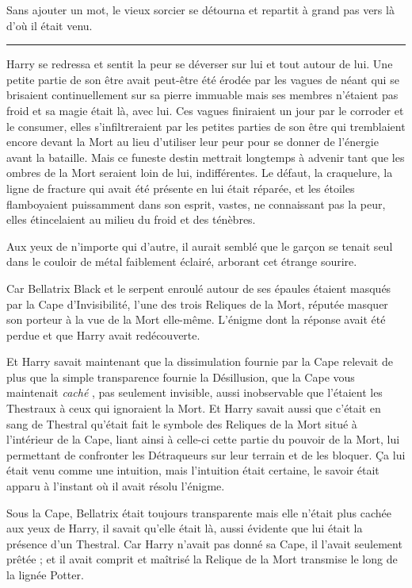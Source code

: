 Sans ajouter un mot, le vieux sorcier se détourna et repartit à grand pas vers là d'où il était venu.
\par\noindent\rule{\textwidth}{0.4pt}
Harry se redressa et sentit la peur se déverser sur lui et tout autour de lui. Une petite partie de son être avait peut-être été érodée par les vagues de néant qui se brisaient continuellement sur sa pierre immuable mais ses membres n'étaient pas froid et sa magie était là, avec lui. Ces vagues finiraient un jour par le corroder et le consumer, elles s'infiltreraient par les petites parties de son être qui tremblaient encore devant la Mort au lieu d'utiliser leur peur pour se donner de l'énergie avant la bataille. Mais ce funeste destin mettrait longtemps à advenir tant que les ombres de la Mort seraient loin de lui, indifférentes. Le défaut, la craquelure, la ligne de fracture qui avait été présente en lui était réparée, et les étoiles flamboyaient puissamment dans son esprit, vastes, ne connaissant pas la peur, elles étincelaient au milieu du froid et des ténèbres.

Aux yeux de n'importe qui d'autre, il aurait semblé que le garçon se tenait seul dans le couloir de métal faiblement éclairé, arborant cet étrange sourire.

Car Bellatrix Black et le serpent enroulé autour de ses épaules étaient masqués par la Cape d'Invisibilité, l'une des trois Reliques de la Mort, réputée masquer son porteur à la vue de la Mort elle-même. L'énigme dont la réponse avait été perdue et que Harry avait redécouverte.

Et Harry savait maintenant que la dissimulation fournie par la Cape relevait de plus que la simple transparence fournie la Désillusion, que la Cape vous maintenait \emph{caché} , pas seulement invisible, aussi inobservable que l'étaient les Thestraux à ceux qui ignoraient la Mort. Et Harry savait aussi que c'était en sang de Thestral qu'était fait le symbole des Reliques de la Mort situé à l'intérieur de la Cape, liant ainsi à celle-ci cette partie du pouvoir de la Mort, lui permettant de confronter les Détraqueurs sur leur terrain et de les bloquer. Ça lui était venu comme une intuition, mais l'intuition était certaine, le savoir était apparu à l'instant où il avait résolu l'énigme.

Sous la Cape, Bellatrix était toujours transparente mais elle n'était plus cachée aux yeux de Harry, il savait qu'elle était là, aussi évidente que lui était la présence d'un Thestral. Car Harry n'avait pas donné sa Cape, il l'avait seulement prêtée ; et il avait comprit et maîtrisé la Relique de la Mort transmise le long de la lignée Potter.

